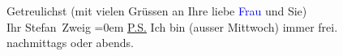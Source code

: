 \pstart
           Getreulichst (mit vielen Grüssen an Ihre liebe \textcolor{blue}{Frau}{}\ledrightnote{{$\rightarrow$}\textcolor{blue}{Olga Schnitzler}} und Sie){\\[\baselineskip]} Ihr \spacefill\mbox{Stefan Zweig}\pend
           \leftskip=0em{}
\pstart
           \noindent{}\uline{P.S.} Ich bin (ausser Mittwoch) immer
                  frei.{\\}nachmittags oder abends.\pend
           \endnumbering{}
\begin{anhang}
\end{anhang}
      